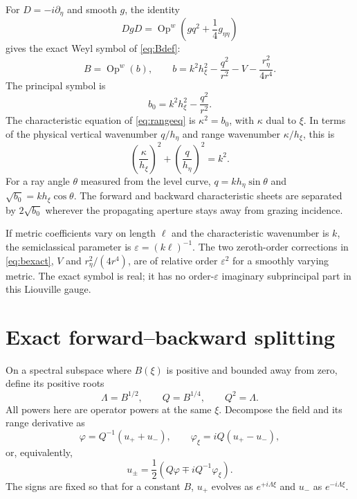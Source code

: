 \documentclass[11pt]{article}
\newcommand{\pd}{\partial}
\newcommand{\Op}{\operatorname{Op}^{w}}
\newcommand{\eps}{\varepsilon}
\begin{document}
For $D=-i\pd_\eta$ and smooth $g$, the identity
\begin{equation}\label{eq:DgD}
  DgD=\Op\!\left(gq^2+\frac14g_{\eta\eta}\right)
\end{equation}
gives the exact Weyl symbol of \eqref{eq:Bdef}:
\begin{equation}\label{eq:bexact}
  B=\Op(b),\qquad
  b=k^2h_\xi^2-\frac{q^2}{r^2}-V-
  \frac{r_\eta^2}{4r^4}.
\end{equation}
The principal symbol is
\begin{equation}\label{eq:bprincipal}
  b_0=k^2h_\xi^2-\frac{q^2}{r^2}.
\end{equation}
The characteristic equation of \eqref{eq:rangeeq} is
$\kappa^2=b_0$, with $\kappa$ dual to $\xi$. In terms of the physical
vertical wavenumber $q/h_\eta$ and range wavenumber $\kappa/h_\xi$, this is
\begin{equation}\label{eq:dispersion}
  \left(\frac{\kappa}{h_\xi}\right)^2+
  \left(\frac{q}{h_\eta}\right)^2=k^2.
\end{equation}
For a ray angle $\theta$ measured from the level curve,
$q=kh_\eta\sin\theta$ and
$\sqrt{b_0}=kh_\xi\cos\theta$. The forward and backward characteristic
sheets are separated by $2\sqrt{b_0}$ wherever the propagating aperture
stays away from grazing incidence.

If metric coefficients vary on length $\ell$ and the characteristic
wavenumber is $k$, the semiclassical parameter is $\eps=(k\ell)^{-1}$.
The two zeroth-order corrections in \eqref{eq:bexact}, $V$ and
$r_\eta^2/(4r^4)$, are of relative order $\eps^2$ for a smoothly varying
metric. The exact symbol is real; it has no order-$\eps$ imaginary
subprincipal part in this Liouville gauge.

\section{Exact forward--backward splitting}

On a spectral subspace where $B(\xi)$ is positive and bounded away from zero,
define its positive roots
\begin{equation}\label{eq:roots}
  \Lambda=B^{1/2},\qquad Q=B^{1/4},\qquad Q^2=\Lambda.
\end{equation}
All powers here are operator powers at the same $\xi$. Decompose the field
and its range derivative as
\begin{equation}\label{eq:split}
  \varphi=Q^{-1}(u_++u_-),\qquad
  \varphi_\xi=iQ(u_+-u_-),
\end{equation}
or, equivalently,
\begin{equation}\label{eq:splitinv}
  u_\pm=\frac12\left(Q\varphi\mp iQ^{-1}\varphi_\xi\right).
\end{equation}
The signs are fixed so that for a constant $B$, $u_+$ evolves as
$e^{+i\Lambda\xi}$ and $u_-$ as $e^{-i\Lambda\xi}$.
\end{document}
